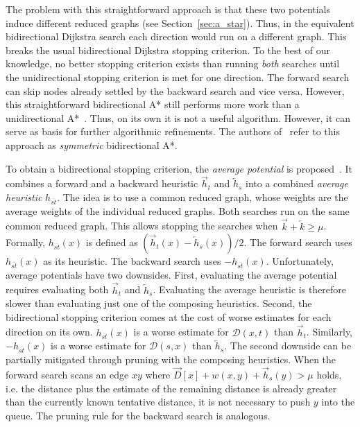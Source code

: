 \documentclass[manuscript,review]{acmart}
\newcommand*{\dist}{\mathcal{D}}
\begin{document}
The problem with this straightforward approach is that these two potentials induce different reduced graphs (see Section~\ref{sec:a_star}).
Thus, in the equivalent bidirectional Dijkstra search each direction would run on a different graph.
This breaks the usual bidirectional Dijkstra stopping criterion.
To the best of our knowledge, no better stopping criterion exists than running \emph{both} searches until the unidirectional stopping criterion is met for one direction.
The forward search can skip nodes already settled by the backward search and vice versa.
However, this straightforward bidirectional A* still performs more work than a unidirectional A*~\cite{gh-cspas-05}.
Thus, on its own it is not a useful algorithm.
However, it can serve as basis for further algorithmic refinements.
The authors of~\cite{gh-cspas-05} refer to this approach as \emph{symmetric} bidirectional A*.

To obtain a bidirectional stopping criterion, the \emph{average potential} is proposed~\cite{gh-cspas-05}.
It combines a forward and a backward heuristic $\overrightarrow{h}_t$ and $\overleftarrow{h}_s$ into a combined \emph{average heuristic} $h_{\overline{st}}$.
The idea is to use a common reduced graph, whose weights are the average weights of the individual reduced graphs.
Both searches run on the same common reduced graph.
This allows stopping the searches when $\overrightarrow{k} + \overleftarrow{k} \geq \mu$.
Formally, $h_{\overline{st}}(x)$ is defined as $(\overrightarrow{h}_t(x) - \overleftarrow{h}_s(x))/2$.
The forward search uses $h_{\overline{st}}(x)$ as its heuristic.
The backward search uses $-h_{\overline{st}}(x)$.
Unfortunately, average potentials have two downsides.
First, evaluating the average potential requires evaluating both $\overrightarrow{h}_t$ and $\overleftarrow{h}_s$.
Evaluating the average heuristic is therefore slower than evaluating just one of the composing heuristics.
Second, the bidirectional stopping criterion comes at the cost of worse estimates for each direction on its own.
$h_{\overline{st}}(x)$ is a worse estimate for $\dist(x,t)$ than $\overrightarrow{h}_t$.
Similarly, $-h_{\overline{st}}(x)$ is a worse estimate for $\dist(s,x)$ than $\overleftarrow{h}_s$.
The second downside can be partially mitigated through pruning with the composing heuristics.
When the forward search scans an edge $xy$ where $\overrightarrow{D}[x] + w(x,y) + \overrightarrow{h}_s(y) > \mu$ holds, i.e. the distance plus the estimate of the remaining distance is already greater than the currently known tentative distance, it is not necessary to push $y$ into the queue.
The pruning rule for the backward search is analogous.
\end{document}
